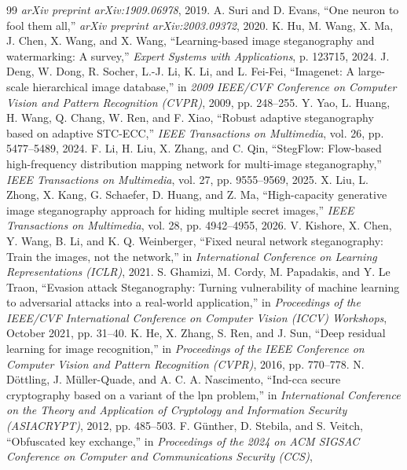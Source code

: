 \documentclass[UTF8,a4paper,zihao=-4,fontset=windows,openany]{ctexbook}
\begin{document}
\begin{thebibliography}{99}
\emph{arXiv preprint arXiv:1909.06978}, 2019.
A. Suri and D. Evans,
``One neuron to fool them all,''
\emph{arXiv preprint arXiv:2003.09372}, 2020.
K. Hu, M. Wang, X. Ma, J. Chen, X. Wang, and X. Wang,
``Learning-based image steganography and watermarking: A survey,''
\emph{Expert Systems with Applications}, p. 123715, 2024.
J. Deng, W. Dong, R. Socher, L.-J. Li, K. Li, and L. Fei-Fei,
``Imagenet: A large-scale hierarchical image database,''
in \emph{2009 IEEE/CVF Conference on Computer Vision and Pattern Recognition (CVPR)},
2009, pp. 248--255.
Y. Yao, L. Huang, H. Wang, Q. Chang, W. Ren, and F. Xiao,
``Robust adaptive steganography based on adaptive STC-ECC,''
\emph{IEEE Transactions on Multimedia},
vol. 26, pp. 5477--5489, 2024.
F. Li, H. Liu, X. Zhang, and C. Qin,
``StegFlow: Flow-based high-frequency distribution mapping network for multi-image steganography,''
\emph{IEEE Transactions on Multimedia},
vol. 27, pp. 9555--9569, 2025.
X. Liu, L. Zhong, X. Kang, G. Schaefer, D. Huang, and Z. Ma,
``High-capacity generative image steganography approach for hiding multiple secret images,''
\emph{IEEE Transactions on Multimedia},
vol. 28, pp. 4942--4955, 2026.
V. Kishore, X. Chen, Y. Wang, B. Li, and K. Q. Weinberger,
``Fixed neural network steganography: Train the images, not the network,''
in \emph{International Conference on Learning Representations (ICLR)}, 2021.
S. Ghamizi, M. Cordy, M. Papadakis, and Y. Le Traon,
``Evasion attack Steganography: Turning vulnerability of machine learning to adversarial attacks into a real-world application,''
in \emph{Proceedings of the IEEE/CVF International Conference on Computer Vision (ICCV) Workshops},
October 2021, pp. 31--40.
K. He, X. Zhang, S. Ren, and J. Sun,
``Deep residual learning for image recognition,''
in \emph{Proceedings of the IEEE Conference on Computer Vision and Pattern Recognition (CVPR)},
2016, pp. 770--778.
N. Döttling, J. Müller-Quade, and A. C. A. Nascimento,
``Ind-cca secure cryptography based on a variant of the lpn problem,''
in \emph{International Conference on the Theory and Application of Cryptology and Information Security (ASIACRYPT)},
2012, pp. 485--503.
F. Günther, D. Stebila, and S. Veitch,
``Obfuscated key exchange,''
in \emph{Proceedings of the 2024 on ACM SIGSAC Conference on Computer and Communications Security (CCS)},

\end{thebibliography}
\end{document}
